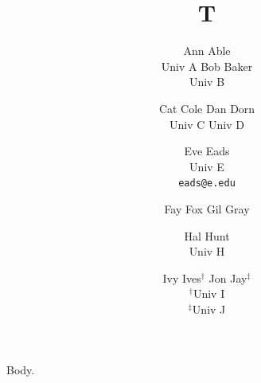 \documentclass{article}
\title{T}
\author{Ann Able \\ Univ A \quad Bob Baker \\ Univ B
\and Cat Cole \quad Dan Dorn \\ Univ C \quad Univ D
\and Eve Eads \\ Univ E \\ \texttt{eads@e.edu}
\and Fay Fox \quad Gil Gray \and Hal Hunt \\ Univ H
\and Ivy Ives$^{\dagger}$ \quad Jon Jay$^{\ddagger}$ \\ $^{\dagger}$Univ I \\ $^{\ddagger}$Univ J}
\begin{document}
\maketitle
Body.
\end{document}
